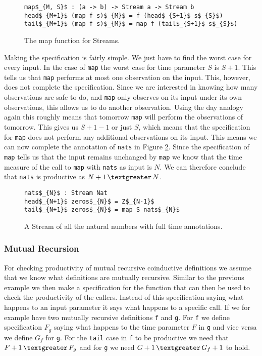 \begin{figure}
\begin{Verbatim}[commandchars=\\\{\},codes={\catcode`$=3\catcode`_=8}]
map$_{M, S}$ : (a -> b) -> Stream a -> Stream b
head$_{M+1}$ (map f s)$_{M}$ = f (head$_{S+1}$ s$_{S}$)
tail$_{M+1}$ (map f s)$_{M}$ = map f (tail$_{S+1}$ s$_{S}$)
\end{Verbatim}
\caption{The map function for Streams.}
\label{fig:map}
\end{figure}

Making the specification is fairly simple. We just have to find the worst case for every input. In the case of \texttt{map} the worst case for time parameter $S$ is $S+1$. This tells us that \texttt{map} performs at most one observation on the input. This, however, does not complete the specification. Since we are interested in knowing how many observations are safe to do, and \texttt{map} only observes on its input under its own observations, this allows us to do another observation. Using the day analogy again this roughly means that tomorrow \texttt{map} will perform the observations of tomorrow. This gives us $S+1-1$ or just $S$, which means that the specification for \texttt{map} does not perform any additional observations on its input. This means we can now complete the annotation of \texttt{nats} in Figure \ref{fig:natsComplete}. Since the specification of \texttt{map} tells us that the input remains unchanged by \texttt{map} we know that the time measure of the call to \texttt{map} with \texttt{nats} as input is $N$. We can therefore conclude that \texttt{nats} is productive as $N+1\,\textgreater\,N$.

\begin{figure}
\begin{Verbatim}[commandchars=\\\{\},codes={\catcode`$=3\catcode`_=8}]
nats$_{N}$ : Stream Nat
head$_{N+1}$ zeros$_{N}$ = Z$_{N-1}$
tail$_{N+1}$ zeros$_{N}$ = map S nats$_{N}$
\end{Verbatim}
\caption{A Stream of all the natural numbers with full time annotations.}
\label{fig:natsComplete}
\end{figure}

\subsubsection{Mutual Recursion}
For checking productivity of mutual recursive coinductive definitions we assume that we know what definitions are mutually recursive. Similar to the previous example we then make a specification for the function that can then be used to check the productivity of the callers. Instead of this specification saying what happens to an input parameter it says what happens to a specific call. If we for example have two mutually recursive definitions \texttt{f} and \texttt{g}. For \texttt{f} we define specification $F_{g}$ saying what happens to the time parameter $F$ in \texttt{g} and vice versa we define $G_{f}$ for \texttt{g}. For the \texttt{tail} case in \texttt{f} to be productive we need that $F+1\,\textgreater\,F_{g}$ and for \texttt{g} we need $G+1\,\textgreater\,G_{f}+1$ to hold.

